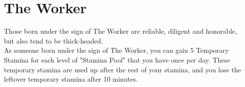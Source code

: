 \section{The Worker}

Those born under the sign of The Worker are reliable, diligent and honorable, but also tend to be thick-headed.\\
As someone born under the sign of The Worker, you can gain 5 Temporary Stamina for each level of "Stamina Pool" that you have once per day. These temporary stamina are used up after the rest of your stamina, and you lose the leftover temporary stamina after 10 minutes.\\
